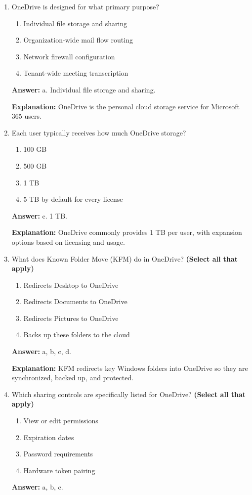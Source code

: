\documentclass[10pt]{article}
\begin{document}
\begin{enumerate}[leftmargin=*]
\textbf{Explanation:} Folders help structure content and can participate in metadata and automation workflows.

\item OneDrive is designed for what primary purpose?
\begin{enumerate}[label=\alph*., leftmargin=1.5em]
\item Individual file storage and sharing
\item Organization-wide mail flow routing
\item Network firewall configuration
\item Tenant-wide meeting transcription
\end{enumerate}
\textbf{Answer:} a. Individual file storage and sharing.

\textbf{Explanation:} OneDrive is the personal cloud storage service for Microsoft 365 users.

\item Each user typically receives how much OneDrive storage?
\begin{enumerate}[label=\alph*., leftmargin=1.5em]
\item 100 GB
\item 500 GB
\item 1 TB
\item 5 TB by default for every license
\end{enumerate}
\textbf{Answer:} c. 1 TB.

\textbf{Explanation:} OneDrive commonly provides 1 TB per user, with expansion options based on licensing and usage.

\item What does Known Folder Move (KFM) do in OneDrive? \textbf{(Select all that apply)}
\begin{enumerate}[label=\alph*., leftmargin=1.5em]
\item Redirects Desktop to OneDrive
\item Redirects Documents to OneDrive
\item Redirects Pictures to OneDrive
\item Backs up these folders to the cloud
\end{enumerate}
\textbf{Answer:} a, b, c, d.

\textbf{Explanation:} KFM redirects key Windows folders into OneDrive so they are synchronized, backed up, and protected.

\item Which sharing controls are specifically listed for OneDrive? \textbf{(Select all that apply)}
\begin{enumerate}[label=\alph*., leftmargin=1.5em]
\item View or edit permissions
\item Expiration dates
\item Password requirements
\item Hardware token pairing
\end{enumerate}
\textbf{Answer:} a, b, c.


\end{enumerate}
\end{document}
